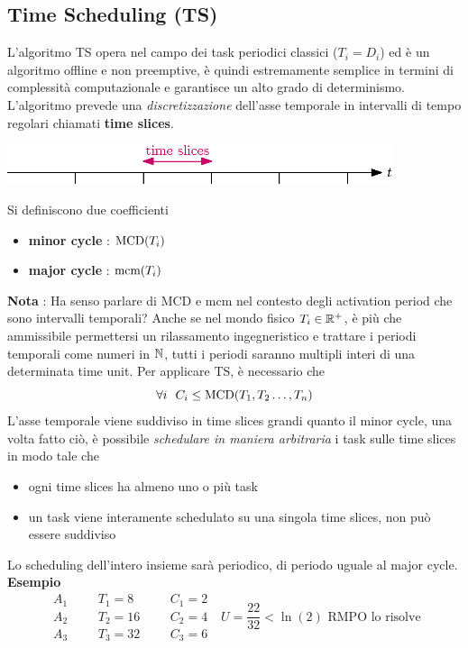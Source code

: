 \documentclass[10pt, letterpaper]{report}
\begin{document}
\subsection{Time Scheduling (TS)}
L'algoritmo TS opera nel campo dei task periodici classici ($T_i=D_i$) ed è un algoritmo 
offline e non preemptive, è quindi estremamente semplice in termini di complessità computazionale e 
garantisce un alto grado di determinismo. \acc 
L'algoritmo prevede una \textit{discretizzazione} dell'asse temporale in intervalli di tempo regolari 
chiamati \textbf{time slices}.
\begin{center}
    \includegraphics[width=0.85\textwidth ]{images/timeSlices.eps}
\end{center}
Si definiscono due coefficienti\begin{itemize}
    \item \textbf{minor cycle} : ${\text{MCD}}(T_i)$ 
    \item \textbf{major cycle} : ${\text{mcm}}(T_i)$ 
\end{itemize}
\textbf{Nota} : Ha senso parlare di MCD e mcm nel contesto degli activation period che sono 
intervalli temporali? Anche se nel mondo fisico $T_i\in{\mathbb R}^+$, è più che ammissibile permettersi un 
rilassamento ingegneristico e trattare i periodi temporali come numeri in ${\mathbb N}$, tutti i periodi saranno 
multipli interi di una determinata time unit.\acc 
Per applicare TS, è necessario che 
$$ \forall i \ \ C_i\le {\text{MCD}}(T_1,T_2\dots , T_n)$$
L'asse temporale viene suddiviso in time slices grandi quanto il minor cycle, una volta fatto ciò, 
è possibile \textit{schedulare in maniera arbitraria} i task sulle time slices in modo tale che \begin{itemize}
    \item ogni time slices ha almeno uno o più task 
    \item un task viene interamente schedulato su una singola time slices, non può essere suddiviso
\end{itemize}
Lo scheduling dell'intero insieme sarà periodico, di periodo uguale al major cycle.
\textbf{Esempio}
$$ 
\begin{matrix}
    A_1 & & & T_1=8 & & & C_1 =2\\ 
    A_2 & & & T_2=16 & & & C_2=4 \\ 
    A_3 & & &T_3=32 &&& C_3=6
\end{matrix} \ \ \ U=\frac{22}{32}<\ln(2)\text{ RMPO lo risolve}
$$
\end{document}
